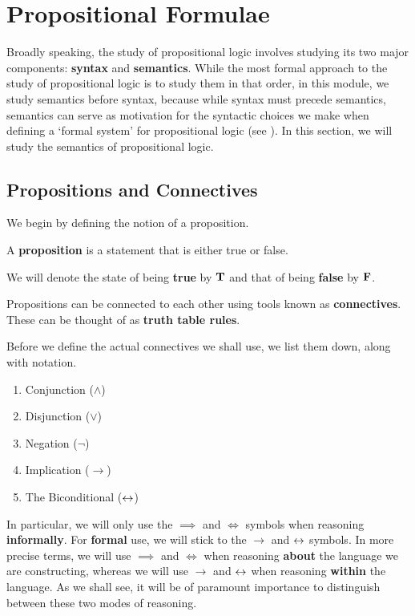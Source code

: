 \section{Propositional Formulae}

Broadly speaking, the study of propositional logic involves studying its two major components: \textbf{syntax} and \textbf{semantics}. While the most formal approach to the study of propositional logic is to study them in that order, in this module, we study semantics before syntax, because while syntax must precede semantics, semantics can serve as motivation for the syntactic choices we make when defining a `formal system' for propositional logic (see ). In this section, we will study the semantics of propositional logic.

\subsection{Propositions and Connectives}

We begin by defining the notion of a proposition.

\begin{boxdefinition}[Proposition]
    A \textbf{proposition} is a statement that is either true or false.
\end{boxdefinition}

\begin{boxconvention}
    We will denote the state of being \textbf{true} by $\mathbf{T}$ and that of being \textbf{false} by $\mathbf{F}$.
\end{boxconvention}

Propositions can be connected to each other using tools known as \textbf{connectives}. These can be thought of as \textbf{truth table rules}.

\begin{boxconvention}
    Before we define the actual connectives we shall use, we list them down, along with notation.
    \begin{enumerate}[noitemsep]
        \item Conjunction ($\land$)
        \item Disjunction ($\lor$)
        \item Negation ($\neg$)
        \item Implication ($\to$)
        \item The Biconditional ($\leftrightarrow$)
    \end{enumerate}
    In particular, we will only use the $\implies$ and $\iff$ symbols when reasoning \textbf{informally}. For \textbf{formal} use, we will stick to the $\to$ and $\leftrightarrow$ symbols. In more precise terms, we will use $\implies$ and $\iff$ when reasoning \textbf{about} the language we are constructing, whereas we will use $\to$ and $\leftrightarrow$ when reasoning \textbf{within} the language. As we shall see, it will be of paramount importance to distinguish between these two modes of reasoning.
\end{boxconvention}

